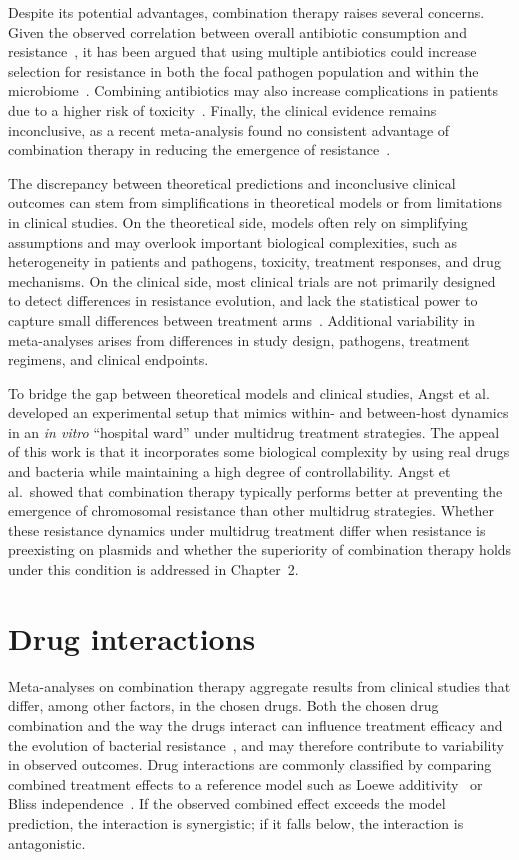 \documentclass[../main.tex]{subfiles}
\begin{document}
Despite its potential advantages, combination therapy raises several concerns.
Given the observed correlation between overall antibiotic consumption and resistance~\cite{Bell2014, Rahman2023}, it has been argued that using multiple antibiotics could increase selection for resistance in both the focal pathogen population and within the microbiome~\cite{Jernberg2007}.
Combining antibiotics may also increase complications in patients due to a higher risk of toxicity~\cite{Tamma2012}.
Finally, the clinical evidence remains inconclusive, as a recent meta-analysis found no consistent advantage of combination therapy in reducing the emergence of resistance~\cite{Siedentop2024}.

The discrepancy between theoretical predictions and inconclusive clinical outcomes can stem from simplifications in theoretical models or from limitations in clinical studies.
On the theoretical side, models often rely on simplifying assumptions and may overlook important biological complexities, such as heterogeneity in patients and pathogens, toxicity, treatment responses, and drug mechanisms.
On the clinical side, most clinical trials are not primarily designed to detect differences in resistance evolution, and lack the statistical power to capture small differences between treatment arms~\cite{Siedentop2024}.
Additional variability in meta-analyses arises from differences in study design, pathogens, treatment regimens, and clinical endpoints.

To bridge the gap between theoretical models and clinical studies, Angst et al.~\cite{Angst2021} developed an experimental setup that mimics within- and between-host dynamics in an \textit{in vitro} ``hospital ward'' under multidrug treatment strategies.
The appeal of this work is that it incorporates some biological complexity by using real drugs and bacteria while maintaining a high degree of controllability.
Angst et al.\ showed that combination therapy typically performs better at preventing the emergence of chromosomal resistance than other multidrug strategies.
Whether these resistance dynamics under multidrug treatment differ when resistance is preexisting on plasmids and whether the superiority of combination therapy holds under this condition is addressed in Chapter~2.

\section{Drug interactions}
Meta-analyses on combination therapy aggregate results from clinical studies that differ, among other factors, in the chosen drugs.
Both the chosen drug combination and the way the drugs interact can influence treatment efficacy and the evolution of bacterial resistance~\cite{Gjini2021}, and may therefore contribute to variability in observed outcomes.
Drug interactions are commonly classified by comparing combined treatment effects to a reference model such as Loewe additivity~\cite{Loewe1926} or Bliss independence~\cite{Bliss1939}.
If the observed combined effect exceeds the model prediction, the interaction is synergistic; if it falls below, the interaction is antagonistic.
\end{document}
